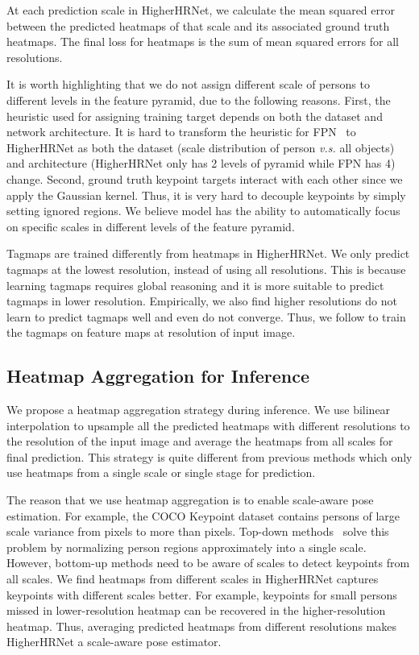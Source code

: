 \documentclass[10pt,twocolumn,letterpaper]{article}
\begin{document}
At each prediction scale in HigherHRNet, we calculate the mean squared error between the predicted heatmaps of that scale and its associated ground truth heatmaps. The final loss for heatmaps is the sum of mean squared errors for all resolutions.

It is worth highlighting that we do not assign different scale of persons to different levels in the feature pyramid, due to the following reasons. First, the heuristic used for assigning training target depends on both the dataset and network architecture. It is hard to transform the heuristic for FPN~\cite{lin2017feature} to HigherHRNet as both the dataset (scale distribution of person \emph{v.s.} all objects) and architecture (HigherHRNet only has 2 levels of pyramid while FPN has 4) change. Second, ground truth keypoint targets interact with each other since we apply the Gaussian kernel. Thus, it is very hard to decouple keypoints by simply setting ignored regions. We believe model has the ability to automatically focus on specific scales in different levels of the feature pyramid.

Tagmaps are trained differently from heatmaps in HigherHRNet. We only predict tagmaps at the lowest resolution, instead of using all resolutions. This is because learning tagmaps requires global reasoning and it is more suitable to predict tagmaps in lower resolution. Empirically, we also find higher resolutions do not learn to predict tagmaps well and even do not converge. Thus, we follow \cite{newwell2017associative} to train the tagmaps on feature maps at  resolution of input image. 

\subsection{Heatmap Aggregation for Inference}
\label{sec:mr_inference}
We propose a heatmap aggregation strategy during inference. We use bilinear interpolation to upsample all the predicted heatmaps with different resolutions to the resolution of the input image and average the heatmaps from all scales for final prediction. This strategy is quite different from previous methods \cite{cao2017realtime,newwell2017associative,papandreou2018personlab} which only use heatmaps from a single scale or single stage for prediction.

The reason that we use heatmap aggregation is to enable scale-aware pose estimation. For example, the COCO Keypoint dataset \cite{lin2014microsoft} contains persons of large scale variance from  pixels to more than  pixels. Top-down methods~\cite{papandreou2017towards,chen2018cascaded,xiao2018simple} solve this problem by normalizing person regions approximately into a single scale. However, bottom-up methods need to be aware of scales to detect keypoints from all scales. We find heatmaps from different scales in HigherHRNet captures keypoints with different scales better. 
For example, keypoints for small persons missed in lower-resolution heatmap can be recovered in the higher-resolution heatmap.
Thus, averaging predicted heatmaps from different resolutions makes HigherHRNet a scale-aware pose estimator.
\end{document}
